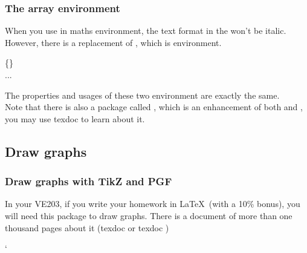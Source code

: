 \begin{frame}
	\frametitle{The array environment}
	When you use  in maths environment, the text format in the  won't be italic. However, there is a replacement of , which is  environment.
	\begin{command}
		\{\}\\
		\qquad ...\\
	\end{command}
	The properties and usages of these two environment are exactly the same. \\[0.5em]
	Note that there is also a package called , which is an enhancement of both  and , you may use \alert{texdoc}  to learn about it.
	
\end{frame}

\subsection{Draw graphs}

\begin{frame}
	\frametitle{Draw graphs with TikZ and PGF}
	In your VE203, if you write your homework in \LaTeX\ (with a 10\% bonus), you will need this package to draw graphs. There is a document of more than one thousand pages about it (\alert{texdoc}  or \alert{texdoc} )\\
	\begin{minipage}{0.45\linewidth}
		\begin{example}
			\centering
%			
		\end{example}
	\end{minipage}
	\hfill
	\begin{minipage}{0.5\linewidth}
%		
	\end{minipage}
\end{frame}

\begin{frame}
	\begin{minipage}{0.53\linewidth}
		\begin{example}
			\centering
%			
		\end{example}`
	\end{minipage}
	\hfill
	\begin{minipage}{0.42\linewidth}
%		
	\end{minipage}
\end{frame}
